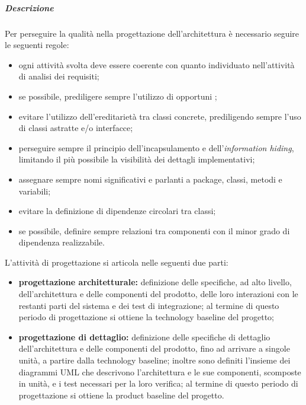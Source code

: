 				\subparagraph{Descrizione}
					Per perseguire la qualità nella progettazione dell'architettura è necessario seguire le seguenti regole:
					\begin{itemize}
						\item ogni attività svolta deve essere coerente con quanto individuato nell'attività di analisi dei requisiti;
						\item se possibile, prediligere sempre l'utilizzo di opportuni ;
						\item evitare l'utilizzo dell'ereditarietà tra classi concrete, prediligendo sempre l'uso di classi astratte e/o interfacce;
						\item perseguire sempre il principio dell'incapsulamento e dell'\textit{information hiding}, limitando il più possibile la visibilità dei dettagli implementativi;
						\item assegnare sempre nomi significativi e parlanti a package, classi, metodi e variabili;
						\item evitare la definizione di dipendenze circolari tra classi;
						\item se possibile, definire sempre relazioni tra componenti con il minor grado di dipendenza realizzabile.
					\end{itemize}
					L'attività di progettazione si articola nelle seguenti due parti: 
					\begin{itemize}
						\item \textbf{progettazione architetturale:} definizione delle specifiche, ad alto livello, dell'architettura e delle componenti del prodotto, delle loro interazioni con le restanti parti del sistema e dei test di integrazione; al termine di questo periodo di progettazione si ottiene la technology baseline del progetto;
						\item \textbf{progettazione di dettaglio:} definizione delle specifiche di dettaglio dell'architettura e delle componenti del prodotto, fino ad arrivare a singole unità, a partire dalla technology baseline; inoltre sono definiti l'insieme dei diagrammi UML che descrivono l'architettura e le sue componenti, scomposte in unità, e i test necessari per la loro verifica; al termine di questo periodo di progettazione si ottiene la product baseline del progetto.
					\end{itemize}
					
